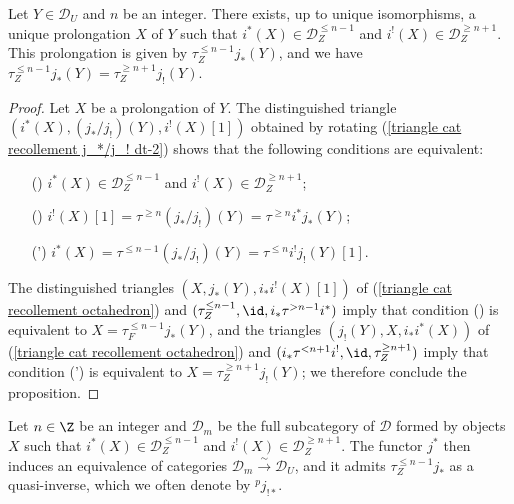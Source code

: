 \begin{proposition}\label{triangle cat recollement prolongation exist}
Let $Y\in\mathcal{D}_U$ and $n$ be an integer. There exists, up to unique isomorphisms, a unique prolongation $X$ of $Y$ such that $i^*(X)\in\mathcal{D}_Z^{\leq n-1}$ and $i^!(X)\in\mathcal{D}_Z^{\geq n+1}$. This prolongation is given by $\tau^{\leq n-1}_Zj_*(Y)$, and we have $\tau^{\leq n-1}_Zj_*(Y)=\tau^{\geq n+1}_Zj_!(Y)$.
\end{proposition}
\begin{proof}
Let $X$ be a prolongation of $Y$. The distinguished triangle $(i^*(X),(j_*/j_!)(Y),i^!(X)[1])$ obtained by rotating (\ref{triangle cat recollement j_*/j_! dt-2}) shows that the following conditions are equivalent:
\begin{enumerate}
    \item[(\rmnum{1})] $i^*(X)\in\mathcal{D}_Z^{\leq n-1}$ and $i^!(X)\in\mathcal{D}_Z^{\geq n+1}$;
    \item[(\rmnum{2})] $i^!(X)[1]=\tau^{\geq n}(j_*/j_!)(Y)=\tau^{\geq n}i^*j_*(Y)$;
    \item[(\rmnum{2}')] $i^*(X)=\tau^{\leq n-1}(j_*/j_!)(Y)=\tau^{\leq n}i^!j_!(Y)[1]$. 
\end{enumerate}
The distinguished triangles $(X,j_*(Y),i_*i^!(X)[1])$ of (\ref{triangle cat recollement octahedron}) and $(\tau^{\leq n-1}_Z,\id,i_*\tau^{>n-1}i^*)$ imply that condition () is equivalent to $X=\tau^{\leq n-1}_Fj_*(Y)$, and the triangles $(j_!(Y),X,i_*i^*(X))$ of (\ref{triangle cat recollement octahedron}) and $(i_*\tau^{<n+1}i^!,\id,\tau_Z^{\geq n+1})$ imply that condition (') is equivalent to $X=\tau_Z^{\geq n+1}j_!(Y)$; we therefore conclude the proposition.
\end{proof}

\begin{remark}\label{triangle cat recollement prolongation equivalence by j^*}
Let $n\in\Z$ be an integer and $\mathcal{D}_m$ be the full subcategory of $\mathcal{D}$ formed by objects $X$ such that $i^*(X)\in\mathcal{D}_Z^{\leq n-1}$ and $i^!(X)\in\mathcal{D}_Z^{\geq n+1}$. The functor $j^*$ then induces an equivalence of categories $\mathcal{D}_m\stackrel{\sim}{\to}\mathcal{D}_U$, and it admits $\tau^{\leq n-1}_Zj_*$ as a quasi-inverse, which we often denote by ${^pj_{!*}}$.
\end{remark}

